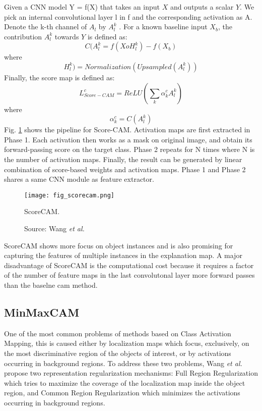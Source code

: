 Given a CNN model Y = f(X) that takes an input $X$ and outputs a scalar $Y$. We pick an internal convolutional layer l in f and the corresponding activation as A. Denote the
k-th channel of $A_l$ by $A^k_l$ . For a known baseline input $X_b$,
the contribution $A^k_l$ towards $Y$ is defined as:
\begin{equation}
    C(A^k_l = f(X o H^k_l) - f(X_b)
\end{equation}
where
\begin{equation}
    H^k_l) = Normalization(Upsampled(A^k_l))
\end{equation}
Finally, the score map is defined as:
\begin{equation}
    L^{c}_{Score-CAM} = ReLU(\sum_{k} \alpha^{c}_{k} A^k_l)
\end{equation}
where
\begin{equation}
    \alpha^{c}_{k} = C(A^k_l)
\end{equation}
Fig. \ref{fig:scorecam} shows the pipeline for Score-CAM. Activation maps are first extracted in Phase 1. Each activation then works as a mask on original image, and obtain its forward-passing score on the target class. Phase 2 repeats for N times where N is the number of activation maps. Finally, the result can be generated by linear combination of score-based weights and activation maps. Phase 1 and Phase 2 shares a
same CNN module as feature extractor. 
\begin{figure}[ht]
    \begin{center}       
    \texttt{[image: fig\_scorecam.png]}
    \caption[ScoreCAM]{ScoreCAM.}
    \caption*{Source: Wang \textit{et al.} \cite{wang2020score}}
    \label{fig:scorecam}
    \end{center}
\end{figure}

ScoreCAM shows more focus on object instances and is also promising for capturing the features of multiple instances in the explanation map. A major disadvantage of ScoreCAM is the computational cost because it requires a factor of the number of feature maps in the last convolutonal layer more forward passes than the baselne \acrshort{cam} method.

\subsection{MinMaxCAM}
One of the most common problems of methods based on Class Activation Mapping, this
is caused either by localization maps which focus, exclusively, on the most discriminative region of the objects of interest, or by activations occurring
in background regions. To address these two problems, Wang \textit{et al.} \cite{wang2021minmaxcam} propose two representation regularization mechanisms: Full Region Regularization which tries to maximize the coverage of the localization map inside the object region, and Common Region Regularization which minimizes the activations occurring in background regions.

